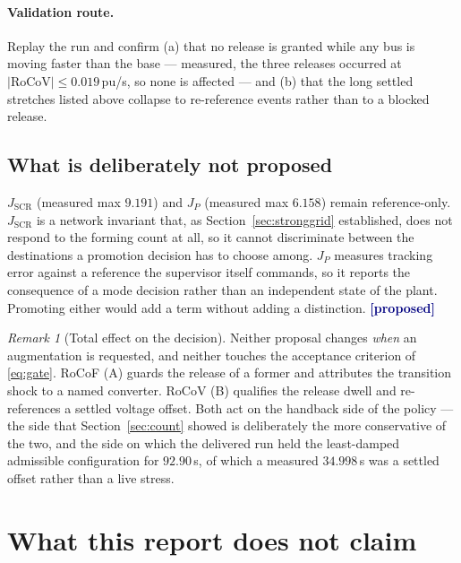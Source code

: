 \documentclass[12pt,a4paper]{article}
\theoremstyle{remark}
\newtheorem{remark}{Remark}
\newcommand{\proposed}{\textcolor{navy}{\textbf{[proposed]}}}
\begin{document}
\paragraph{Validation route.} Replay the run and confirm (a) that no release is
granted while any bus is moving faster than the base --- measured, the three
releases occurred at $|\mathrm{RoCoV}| \le 0.019$\,pu/s, so none is affected ---
and (b) that the long settled stretches listed above collapse to re-reference
events rather than to a blocked release.

\subsection{What is deliberately not proposed}

$J_{\text{SCR}}$ (measured max $9.191$) and $J_P$ (measured max $6.158$) remain
reference-only. $J_{\text{SCR}}$ is a network invariant that, as
Section~\ref{sec:stronggrid} established, does not respond to the forming count
at all, so it cannot discriminate between the destinations a promotion decision
has to choose among. $J_P$ measures tracking error against a reference the
supervisor itself commands, so it reports the consequence of a mode decision
rather than an independent state of the plant. Promoting either would add a term
without adding a distinction. \proposed

\begin{remark}[Total effect on the decision]
Neither proposal changes \emph{when} an augmentation is requested, and neither
touches the acceptance criterion of \eqref{eq:gate}. RoCoF (A) guards the release
of a former and attributes the transition shock to a named converter. RoCoV (B)
qualifies the release dwell and re-references a settled voltage offset. Both act
on the handback side of the policy --- the side that Section~\ref{sec:count}
showed is deliberately the more conservative of the two, and the side on which
the delivered run held the least-damped admissible configuration for
$92.90$\,s, of which a measured $34.998$\,s was a settled offset rather than a
live stress.
\end{remark}

\section{What this report does not claim}\label{sec:notclaimed}
\end{document}
